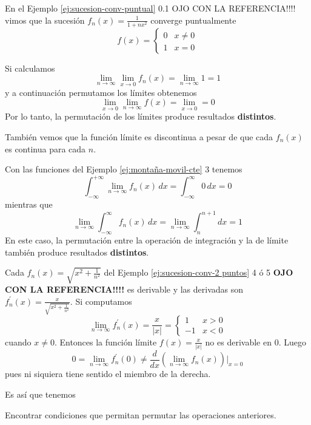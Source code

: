 \begin{ejemplo}{}
En el Ejemplo \ref{ej:sucesion-conv-puntual} 0.1 OJO CON LA REFERENCIA!!!!
vimos que  la sucesión 
$f_n(x)=\frac{1}{1+nx^2}$ converge puntualmente 
\[f(x)=\left\{\begin{array}{ll}
0&x\neq 0
\\
1&x=0
\end{array}
\right.\]

Si calculamos 
\[
\lim\limits_{n\to \infty}\lim\limits_{x \to 0}f_n(x)=\lim\limits_{n \to \infty}1=1
\]
y a continuación permutamos los límites obtenemos
\[
\lim\limits_{x\to 0}\lim\limits_{n \to \infty}f (x)=\lim\limits_{x \to 0}=0
\]
Por lo tanto, la permutación de los límites produce resultados \textbf{distintos}.

También vemos que la función límite es discontinua a pesar de que cada $f_n(x)$ es continua para cada $n$.
\end{ejemplo}

\begin{ejemplo}{}
Con las funciones del Ejemplo \ref{ej:montaña-movil-cte} 3 tenemos
\[
\int_{-\infty}^{+\infty} \lim\limits_{n \to  \infty} f_n(x)\,dx=\int_{-\infty}^{\infty} 0\,dx=0
\]
mientras que 
\[
\lim\limits_{n \to \infty} \int_{-\infty}^{\infty} f_n(x)\,dx=\lim\limits_{n \to \infty} \int_{n}^{n+1}dx=1
\]
En este caso, la permutación entre la operación de integración y la de límite también produce resultados \textbf{distintos}.
\end{ejemplo}

\begin{ejemplo}{}
Cada $f_n(x)=\sqrt{x^2+\frac{1}{n^2}}$ del Ejemplo \ref{ej:sucesion-conv-2 puntos} 4 ó 5 \textbf{OJO CON LA REFERENCIA!!!!}
es derivable y las derivadas son
$f_n^{'}(x)=\frac{x}{\sqrt{x^2+\frac{1}{n^2}}}$. 
Si computamos
\[
\lim\limits_{n \to \infty} f_n^{'}(x)=\frac{x}{|x|}=
\left\{
\begin{array}{ll}
1&x>0
\\
-1&x<0
\end{array}
\right.\]
cuando $x\neq 0$.
Entonces la funci\'on límite $f(x)=\frac{x}{|x|}$ no es derivable en 0. Luego  
\[
0=\lim\limits_{n \to \infty}f_n^{'}(0)\neq \frac{d}{dx}\left(\lim\limits_{n \to \infty}f_n(x)\right)\left. \right|_{x=0}
\]
pues ni siquiera tiene sentido el miembro de la derecha.
\end{ejemplo}

Es así que tenemos  
\begin{mdframed}[style=MiEstilo]\relax%
Encontrar condiciones que permitan permutar las operaciones anteriores.
\end{mdframed}



